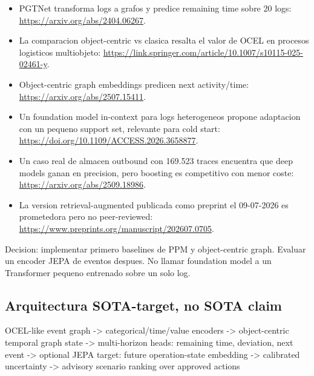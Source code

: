 \documentclass[
  spanish,
  10pt,
  a4paper,
]{article}
\newenvironment{Shaded}{}{}
\newcommand{\NormalTok}[1]{#1}
\providecommand{\tightlist}{%
  \setlength{\itemsep}{0pt}\setlength{\parskip}{0pt}}
\begin{document}
\begin{itemize}
\tightlist
\item
  PGTNet transforma logs a grafos y predice remaining time sobre 20
  logs: \url{https://arxiv.org/abs/2404.06267}.
\item
  La comparacion object-centric vs clasica resalta el valor de OCEL en
  procesos logisticos multiobjeto:
  \url{https://link.springer.com/article/10.1007/s10115-025-02461-y}.
\item
  Object-centric graph embeddings predicen next activity/time:
  \url{https://arxiv.org/abs/2507.15411}.
\item
  Un foundation model in-context para logs heterogeneos propone
  adaptacion con un pequeno support set, relevante para cold start:
  \url{https://doi.org/10.1109/ACCESS.2026.3658877}.
\item
  Un caso real de almacen outbound con 169.523 traces encuentra que deep
  models ganan en precision, pero boosting es competitivo con menor
  coste: \url{https://arxiv.org/abs/2509.18986}.
\item
  La version retrieval-augmented publicada como preprint el 09-07-2026
  es prometedora pero no peer-reviewed:
  \url{https://www.preprints.org/manuscript/202607.0705}.
\end{itemize}

Decision: implementar primero baselines de PPM y object-centric graph.
Evaluar un encoder JEPA de eventos despues. No llamar foundation model a
un Transformer pequeno entrenado sobre un solo log.

\subsection{Arquitectura SOTA-target, no SOTA
claim}\label{arquitectura-sota-target-no-sota-claim}

\begin{Shaded}
\begin{Highlighting}[]
\NormalTok{OCEL{-}like event graph}
\NormalTok{  {-}\textgreater{} categorical/time/value encoders}
\NormalTok{  {-}\textgreater{} object{-}centric temporal graph state}
\NormalTok{  {-}\textgreater{} multi{-}horizon heads: remaining time, deviation, next event}
\NormalTok{  {-}\textgreater{} optional JEPA target: future operation{-}state embedding}
\NormalTok{  {-}\textgreater{} calibrated uncertainty}
\NormalTok{  {-}\textgreater{} advisory scenario ranking over approved actions}
\end{Highlighting}
\end{Shaded}
\end{document}
